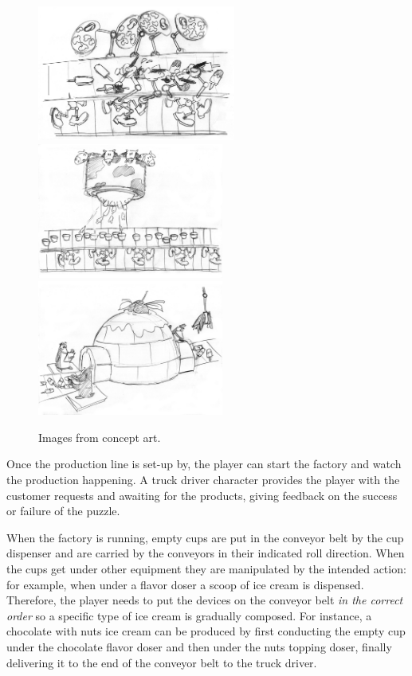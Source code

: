\documentclass{sigchi}
\begin{document}
\begin{figure}
        \vspace{2.2em}
        \includegraphics[height=12em]{03}
        \includegraphics[height=12em]{04}
        \includegraphics[height=12em]{05}

        \caption{Images from concept art.}
        \label{fig:conceptart}
    \end{figure}

    Once the production line is set-up by, the player can start the factory and
    watch the production happening. A truck driver character provides the player
    with the customer requests and awaiting for the products, giving feedback on
    the success or failure of the puzzle.

    When the factory is running, empty cups are put in the conveyor belt by the
    cup dispenser and are carried by the conveyors in their indicated roll
    direction. When the cups get under other equipment they are manipulated by
    the intended action: for example, when under a flavor doser a scoop of ice
    cream is dispensed. Therefore, the player needs to put the devices on the
    conveyor belt \textit{in the correct order} so a specific type of ice cream
    is gradually composed. For instance, a chocolate with nuts ice cream can be
    produced by first conducting the empty cup under the chocolate flavor doser
    and then under the nuts topping doser, finally delivering it to the end of
    the conveyor belt to the truck driver.
\end{document}
